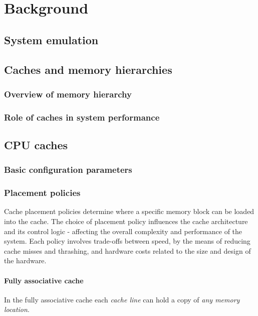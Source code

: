 
\chapter{Background}


\section{System emulation}
%

\section{Caches and memory hierarchies}
\subsection{Overview of memory hierarchy}
\subsection{Role of caches in system performance}
%

\section{CPU caches}
\subsection{Basic configuration parameters}
%
\subsection{Placement policies}
Cache placement policies determine where a specific memory block can be loaded into
the cache. The choice of placement policy influences the cache architecture and
its control logic - affecting the overall complexity and performance of the system.
Each policy involves trade-offs between speed, by the means of reducing cache misses and
thrashing, and hardware costs related to the size and design of the hardware.


\subsubsection{Fully associative cache}
In the fully associative cache each \textit{cache line} can hold a copy of
\textit{any memory location}.

